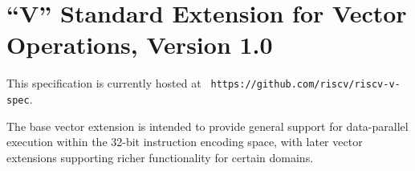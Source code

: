 \chapter{``V'' Standard Extension for Vector Operations, Version 1.0}
\label{sec:vector}

This specification is currently hosted at {\tt
  https://github.com/riscv/riscv-v-spec}.

\begin{commentary}
The base vector extension is intended to provide general support for
data-parallel execution within the 32-bit instruction encoding space,
with later vector extensions supporting richer functionality for
certain domains.
\end{commentary}
  


